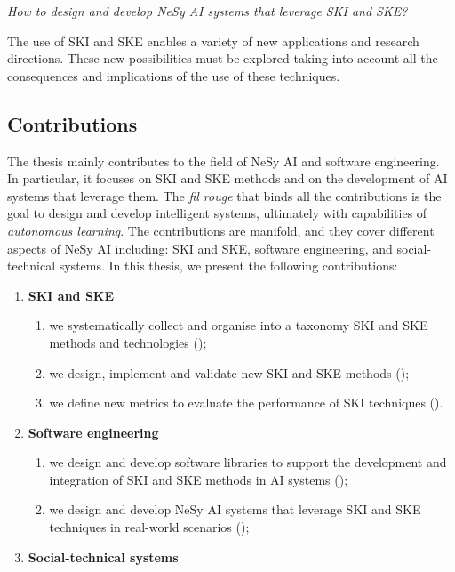\begin{refsection}
\begin{questions}
    \item \emph{How to design and develop \gls{NeSy} \gls{AI} systems that leverage \gls{SKI} and \gls{SKE}?}

    The use of \gls{SKI} and \gls{SKE} enables a variety of new applications and research directions.
    These new possibilities must be explored taking into account all the consequences and implications of the use of these techniques.
    \label{itm:rq4}
\end{questions}


\subsection*{Contributions}
%
The thesis mainly contributes to the field of \gls{NeSy} \gls{AI} and software engineering.
%
In particular, it focuses on \gls{SKI} and \gls{SKE} methods and on the development of \gls{AI} systems that leverage them.
%
The \textit{fil rouge} that binds all the contributions is the goal to design and develop intelligent systems, ultimately with capabilities of \emph{autonomous learning}.
%
The contributions are manifold, and they cover different aspects of \gls{NeSy} \gls{AI} including: \gls{SKI} and \gls{SKE}, software engineering, and social-technical systems.
%
In this thesis, we present the following contributions:
%
\begin{enumerate}[label=\emph{(\roman*)}]
    \item \textbf{\gls{SKI} and \gls{SKE}}

    \begin{enumerate}[label=\emph{(\arabic*)},resume]
        \item we systematically collect and organise into a taxonomy \gls{SKI} and \gls{SKE} methods and technologies ();
        \item we design, implement and validate new \gls{SKI} and \gls{SKE} methods ();
        \item we define new metrics to evaluate the performance of \gls{SKI} techniques ().
    \end{enumerate}
    \item \textbf{Software engineering}

    \begin{enumerate}[label=\emph{(\arabic*)},resume]
        \item we design and develop software libraries to support the development and integration of \gls{SKI} and \gls{SKE} methods in \gls{AI} systems ();
        \item we design and develop \gls{NeSy} \gls{AI} systems that leverage \gls{SKI} and \gls{SKE} techniques in real-world scenarios ();
    \end{enumerate}
    \item \textbf{Social-technical systems}


\end{enumerate}
\end{refsection}

